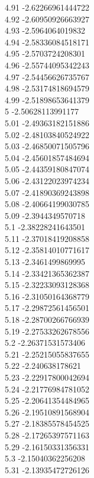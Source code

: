{4.91	-2.62266961444722\\
4.92	-2.60950926663927\\
4.93	-2.5964064019832\\
4.94	-2.58336084518171\\
4.95	-2.5703724208301\\
4.96	-2.55744095342243\\
4.97	-2.54456626735767\\
4.98	-2.53174818694579\\
4.99	-2.51898653641379\\
5	-2.50628113991177\\
5.01	-2.49363182151886\\
5.02	-2.48103840524922\\
5.03	-2.46850071505796\\
5.04	-2.45601857484694\\
5.05	-2.44359180847074\\
5.06	-2.43122023974234\\
5.07	-2.41890369243898\\
5.08	-2.40664199030785\\
5.09	-2.3944349570718\\
5.1	-2.38228241643501\\
5.11	-2.37018419208858\\
5.12	-2.35814010771617\\
5.13	-2.3461499869995\\
5.14	-2.33421365362387\\
5.15	-2.32233093128368\\
5.16	-2.31050164368779\\
5.17	-2.29872561456501\\
5.18	-2.28700266766939\\
5.19	-2.27533262678556\\
5.2	-2.26371531573406\\
5.21	-2.25215055837655\\
5.22	-2.240638178621\\
5.23	-2.22917800042694\\
5.24	-2.21776984781052\\
5.25	-2.20641354484965\\
5.26	-2.19510891568904\\
5.27	-2.18385578454525\\
5.28	-2.17265397571163\\
5.29	-2.16150331356331\\
5.3	-2.15040362256208\\
5.31	-2.13935472726126\\
}
